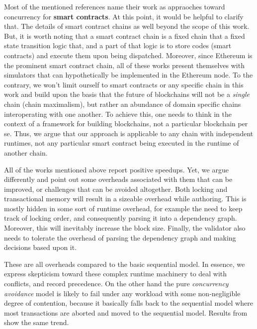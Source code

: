 \begin{remark}
	Most of the mentioned references name their work as appraoches toward concurrency for
	\textbf{smart contracts}. At this point, it would be helpful to clarify that. The details of
	smart contract chains as well beyond the scope of this work. But, it is worth noting that a
	smart contract chain is a fixed chain that a fixed state transition logic that, and a part of
	that logic is to store codes (smart contracts) and execute them upon being dispatched. Moreover,
	since Ethereum is the prominent smart contract chain, all of these works present themselves with
	simulators that can hypothetically be implemented in the Ethereum node. To the contrary, we
	won't limit ourself to smart contracts or any specific chain in this work and build upon the
	basis that the future of blockchains will not be a \textit{single} chain (chain maximalism), but
	rather an abundance of domain specific chains interoperating with one another. To achieve this,
	one needs to think in the context of a framework for building blockchains, not a particular
	blockchain per se. Thus, we argue that our approach is applicable to any chain with independent
	runtimes, not any particular smart contract being executed in the runtime of another chain.
\end{remark}

All of the works mentioned above report positive speedups. Yet, we argue differently and point out
some overheads associated with them that can be improved, or challenges that can be avoided
altogether. Both locking and transactional memory will result in a sizeable overhead while
authoring. This is mostly hidden in some sort of runtime overhead, for example the need to keep
track of locking order, and consequently parsing it into a dependency graph. Moreover, this will
inevitably increase the block size. Finally, the validator also needs to tolerate the overhead of
parsing the dependency graph and making decisions based upon it.

These are all overheads compared to the basic sequential model. In essence, we express skepticism
toward these complex runtime machinery to deal with conflicts, and record precedence. On the other
hand the pure \textit{concurrency avoidance} model is likely to fail under any workload with some
non-negligible degree of contention, because it basically falls back to the sequential model where
most transactions are aborted and moved to the sequential model. Results from
\cite{saraphYOLOEmpiricalStudy2019} show the same trend.

